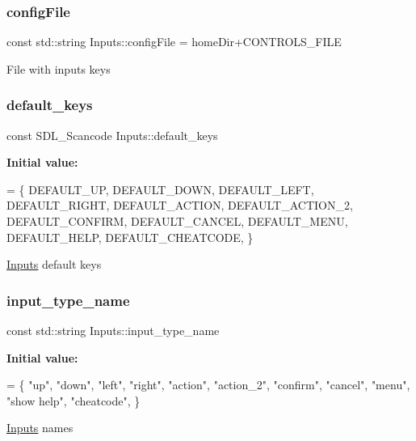 \subsubsection{\texorpdfstring{config\+File}{configFile}}
{\footnotesize\ttfamily const std\+::string Inputs\+::config\+File = home\+Dir+C\+O\+N\+T\+R\+O\+L\+S\+\_\+\+F\+I\+LE\hspace{0.3cm}{\ttfamily [static]}}

File with inputs keys \mbox{\label{class_inputs_a4b883aab8a890c79347f37897e47af2d}} 
\subsubsection{\texorpdfstring{default\+\_\+keys}{default\_keys}}
{\footnotesize\ttfamily const S\+D\+L\+\_\+\+Scancode Inputs\+::default\+\_\+keys\hspace{0.3cm}{\ttfamily [static]}}

{\bfseries Initial value\+:}
\begin{DoxyCode}
= \{
    DEFAULT\_UP,
    DEFAULT\_DOWN,
    DEFAULT\_LEFT,
    DEFAULT\_RIGHT,
    DEFAULT\_ACTION,
    DEFAULT\_ACTION\_2,
    DEFAULT\_CONFIRM,
    DEFAULT\_CANCEL,
    DEFAULT\_MENU,
    DEFAULT\_HELP,
    DEFAULT\_CHEATCODE,
\}
\end{DoxyCode}
\hyperlink{class_inputs}{Inputs} default keys \mbox{\label{class_inputs_a617379938c0c70b30922928e4fff4052}} 
\subsubsection{\texorpdfstring{input\+\_\+type\+\_\+name}{input\_type\_name}}
{\footnotesize\ttfamily const std\+::string Inputs\+::input\+\_\+type\+\_\+name\hspace{0.3cm}{\ttfamily [static]}}

{\bfseries Initial value\+:}
\begin{DoxyCode}
= \{
    \textcolor{stringliteral}{"up"},
    \textcolor{stringliteral}{"down"},
    \textcolor{stringliteral}{"left"},
    \textcolor{stringliteral}{"right"},
    \textcolor{stringliteral}{"action"},
    \textcolor{stringliteral}{"action\_2"},
    \textcolor{stringliteral}{"confirm"},
    \textcolor{stringliteral}{"cancel"},
    \textcolor{stringliteral}{"menu"},
    \textcolor{stringliteral}{"show help"},
    \textcolor{stringliteral}{"cheatcode"},
\}
\end{DoxyCode}
\hyperlink{class_inputs}{Inputs} names \mbox{\label{class_inputs_abcadc39fbb6eee0b5d5b571070bf79ef}} 
